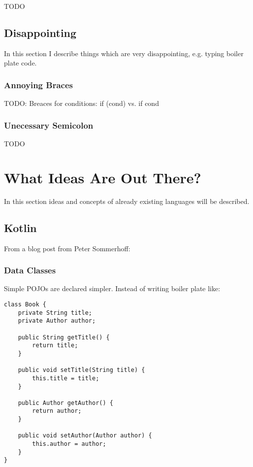 \documentclass[a4paper,12pt]{article}
\begin{document}
TODO

\subsection{Disappointing}

In this section I describe things which are very disappointing, e.g. typing boiler plate code.

\subsubsection{Annoying Braces}

TODO: Breaces for conditions: if (cond) vs. if cond

\subsubsection{Unecessary Semicolon}

TODO

\section{What Ideas Are Out There?}

In this section ideas and concepts of already existing languages will be described.

\subsection{Kotlin}

From a blog post from Peter Sommerhoff\cite{kotlin-sommerhoff}:

\subsubsection{Data Classes}

Simple POJOs are declared simpler. Instead of writing boiler plate like:

\begin{verbatim}
class Book {
    private String title;
    private Author author;

    public String getTitle() {
        return title;
    }
    
    public void setTitle(String title) {
        this.title = title;
    }

    public Author getAuthor() {
        return author;
    }
    
    public void setAuthor(Author author) {
        this.author = author;
    }
}
\end{verbatim}
\end{document}
